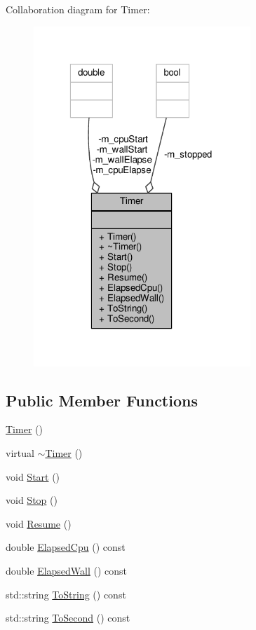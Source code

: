 Collaboration diagram for Timer\-:
\nopagebreak
\begin{figure}[H]
\begin{center}
\leavevmode
\includegraphics[width=232pt]{classTimer__coll__graph}
\end{center}
\end{figure}
\subsection*{Public Member Functions}
\begin{DoxyCompactItemize}
\item 
\hyperlink{classTimer_a5f16e8da27d2a5a5242dead46de05d97}{Timer} ()
\item 
virtual \hyperlink{classTimer_a14fa469c4c295c5fa6e66a4ad1092146}{$\sim$\-Timer} ()
\item 
void \hyperlink{classTimer_a4e607b129b392c11adddd9641a320436}{Start} ()
\item 
void \hyperlink{classTimer_a6379e797f968aaee6ac3bb12dc6b81c5}{Stop} ()
\item 
void \hyperlink{classTimer_ad3b4e386f8ebb885fa2ef6fcac8d9ca3}{Resume} ()
\item 
double \hyperlink{classTimer_a587790d9ce5c034e9b36984813e1e605}{Elapsed\-Cpu} () const 
\item 
double \hyperlink{classTimer_a4c1956ab933185eb2c64168ff8805c8e}{Elapsed\-Wall} () const 
\item 
std\-::string \hyperlink{classTimer_a4849689a80aff58f35edd5f7a818add2}{To\-String} () const 
\item 
std\-::string \hyperlink{classTimer_a795b041a2b7a515e0f03fabbfa253393}{To\-Second} () const 
\end{DoxyCompactItemize}
